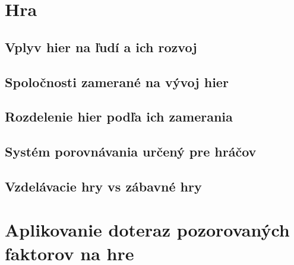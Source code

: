 \documentclass[10pt,twoside,slovak,a4paper]{article}
\begin{document}
\section{Hra}

\subsection{Vplyv hier na ľudí a ich rozvoj}

\subsection{Spoločnosti zamerané na vývoj hier}

\subsection{Rozdelenie hier podľa ich zamerania}

\subsection{Systém porovnávania určený pre hráčov}

\subsection{Vzdelávacie hry vs zábavné hry}

\section{Aplikovanie doteraz pozorovaných faktorov na hre}








\end{document}
